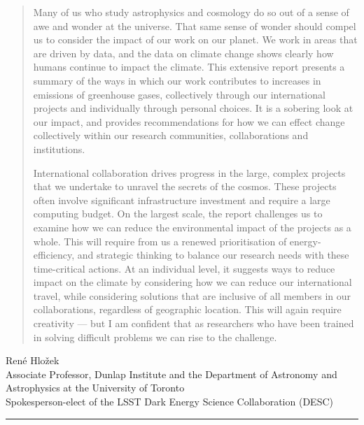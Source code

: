 \documentclass[../SustainableHEP.tex]{subfiles}
\begin{document}
\begin{quotation}
Many of us who study astrophysics and cosmology do so out of a sense of awe and wonder at the universe. That same sense of wonder should compel us to consider the impact of our work on our planet. We work in areas that are driven by data, and the data on climate change shows clearly how humans continue to impact the climate.  This extensive report presents a summary of the ways in which our work contributes to increases in emissions of greenhouse gases, collectively through our international projects and individually through personal choices. It is a sobering look at our impact, and provides recommendations for how we can effect change collectively within our research communities, collaborations and institutions. 

International collaboration drives progress in the large, complex projects that we undertake to unravel the secrets of the cosmos. These projects often involve significant infrastructure investment and require a large computing budget. On the largest scale, the report challenges us to examine how we can reduce the environmental impact of the projects as a whole. This will require from us a renewed prioritisation of energy-efficiency, and strategic thinking to balance our research needs with these time-critical actions.  At an individual level, it suggests ways to reduce impact on the climate by considering how we can reduce our international travel, while considering solutions that are inclusive of all members in our collaborations, regardless of geographic location. This will again require creativity — but I am confident that as researchers who have been trained in solving difficult problems we can rise to the challenge.
\end{quotation}
\begin{flushleft}
Ren\'e Hlo\v{z}ek\\
Associate Professor, Dunlap Institute and the Department of Astronomy and Astrophysics at the University of Toronto\\
Spokesperson-elect of the LSST Dark Energy Science Collaboration (DESC)
\end{flushleft}

\textcolor{Pythongreen}{\rule{2cm}{3pt}}
\end{document}
